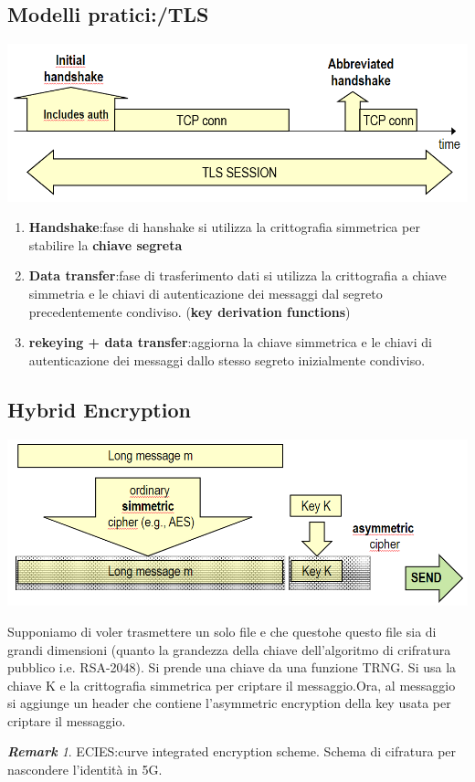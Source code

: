 \documentclass{book}
\theoremstyle{remark}
\newtheorem*{remark}{\textbf{Remark}}
\begin{document}
\subsection{Modelli pratici:\@HTTP/TLS}
\begin{center}
	\includegraphics[scale=0.5]{2021-12-03-18-48-36.png}
\end{center}
\begin{enumerate}
	\item \textbf{Handshake}:\@Nella fase di hanshake si utilizza la crittografia simmetrica per stabilire la \textbf{chiave segreta}
	\item \textbf{Data transfer}:\@Nella fase di trasferimento dati si utilizza la crittografia a chiave simmetria e le chiavi di autenticazione dei messaggi dal segreto precedentemente condiviso\@. (\textbf{key derivation functions})
	\item \textbf{rekeying + data transfer}:\@si aggiorna la chiave simmetrica e le chiavi di autenticazione dei messaggi dallo stesso segreto inizialmente condiviso\@.
\end{enumerate}
\subsection{Hybrid Encryption}
\begin{center}
	\includegraphics[scale=0.5]{2021-12-03-18-59-15.png}
\end{center}
Supponiamo di voler trasmettere un solo file e che questohe questo file sia di grandi dimensioni (quanto la grandezza della chiave dell'algoritmo di crifratura pubblico i\@.e\@. RSA-2048)\@. Si prende una chiave da una funzione TRNG\@. Si usa la chiave K e la crittografia simmetrica per criptare il messaggio\@.\newline Ora, al messaggio si aggiunge un header che contiene l'asymmetric encryption della key usata per criptare il messaggio\@.
\begin{remark}
	ECIES:\@Elliptic curve integrated encryption scheme\@. Schema di cifratura per nascondere l'identità in 5G\@.
\end{remark}
\end{document}
